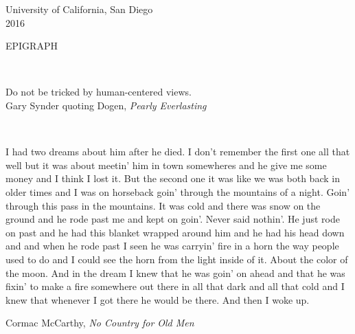 \documentclass[12pt, oneside]{book}
\begin{document}
\begingroup
  \centering
  University of California, San Diego \\[2ex]
  2016 \par
\endgroup


\clearpage {} {}
\singlespacing
\begingroup
	\centering 
	EPIGRAPH \par
\endgroup

$\, $ \vspace{2ex}

\begin{flushright}
Do not be tricked by human-centered views. \\[2ex]
Gary Synder quoting Dogen, \textit{Pearly Everlasting}
\end{flushright}

$\, $ \vfill
 
I had two dreams about him after he died. I don't remember the first one all that well but it was about meetin' him in town somewheres and he give me some money and I think I lost it. But the second one it was like we was both back in older times and I was on horseback goin' through the mountains of a night. Goin' through this pass in the mountains. It was cold and there was snow on the ground and he rode past me and kept on goin'. Never said nothin'. He just rode on past and he had this blanket wrapped around him and he had his head down and and when he rode past I seen he was carryin' fire in a horn the way people used to do and I could see the horn from the light inside of it. About the color of the moon. And in the dream I knew that he was goin' on ahead and that he was fixin' to make a fire somewhere out there in all that dark and all that cold and I knew that whenever I got there he would be there.
And then I woke up.

\begin{flushright}
Cormac McCarthy, \textit{No Country for Old Men}
\end{flushright}


\clearpage {} {}
\singlespacing
\renewcommand\contentsname{Table of Contents}
{\let\cleardoublepage\relax \tableofcontents}

\clearpage {} {}
{\let\cleardoublepage\relax \listoffigures}
\end{document}
